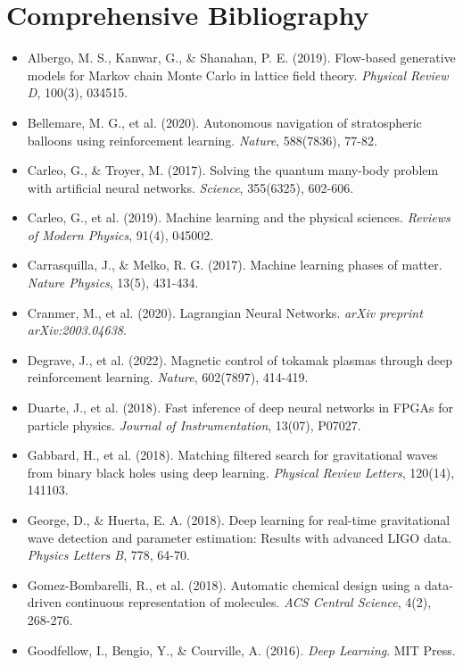 \chapter{Comprehensive Bibliography}

\begin{itemize}[leftmargin=1.5cm]
    \item Albergo, M. S., Kanwar, G., \& Shanahan, P. E. (2019). Flow-based generative models for Markov chain Monte Carlo in lattice field theory. \textit{Physical Review D}, 100(3), 034515.
    \item Bellemare, M. G., et al. (2020). Autonomous navigation of stratospheric balloons using reinforcement learning. \textit{Nature}, 588(7836), 77-82.
    \item Carleo, G., \& Troyer, M. (2017). Solving the quantum many-body problem with artificial neural networks. \textit{Science}, 355(6325), 602-606.
    \item Carleo, G., et al. (2019). Machine learning and the physical sciences. \textit{Reviews of Modern Physics}, 91(4), 045002.
    \item Carrasquilla, J., \& Melko, R. G. (2017). Machine learning phases of matter. \textit{Nature Physics}, 13(5), 431-434.
    \item Cranmer, M., et al. (2020). Lagrangian Neural Networks. \textit{arXiv preprint arXiv:2003.04638}.
    \item Degrave, J., et al. (2022). Magnetic control of tokamak plasmas through deep reinforcement learning. \textit{Nature}, 602(7897), 414-419.
    \item Duarte, J., et al. (2018). Fast inference of deep neural networks in FPGAs for particle physics. \textit{Journal of Instrumentation}, 13(07), P07027.
    \item Gabbard, H., et al. (2018). Matching filtered search for gravitational waves from binary black holes using deep learning. \textit{Physical Review Letters}, 120(14), 141103.
    \item George, D., \& Huerta, E. A. (2018). Deep learning for real-time gravitational wave detection and parameter estimation: Results with advanced LIGO data. \textit{Physics Letters B}, 778, 64-70.
    \item Gomez-Bombarelli, R., et al. (2018). Automatic chemical design using a data-driven continuous representation of molecules. \textit{ACS Central Science}, 4(2), 268-276.
    \item Goodfellow, I., Bengio, Y., \& Courville, A. (2016). \textit{Deep Learning}. MIT Press.

\end{itemize}
